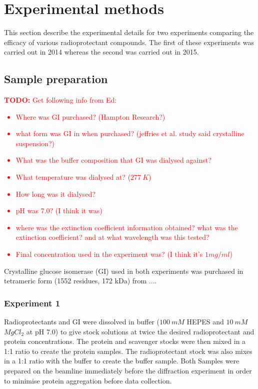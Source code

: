\section{Experimental methods}
\label{sec:Experimental methods}
This section describe the experimental details for two experiments comparing the efficacy of various radioprotectant compounds. The first of these experiments was carried out in 2014 whereas the second was carried out in 2015.

\subsection{Sample preparation}
\label{sub:Sample preparation}
\textcolor{red}{
    \begin{myenumerate}
        \item \hypertarget{todo:Need info from Ed}{\textbf{TODO:} Get following info from Ed:}
        \begin{itemize}
            \item Where was GI purchased? (Hampton Research?)
            \item what form was GI in when purchased? (jeffries et al. study said crystalline suspension?)
            \item What was the buffer composition that GI was dialysed against?
            \item What temperature was dialysed at? ($277\ K$)
            \item How long was it dialysed?
            \item pH was 7.0? (I think it was)
            \item where was the extinction coefficient information obtained? what was the extinction coefficient? and at what wavelength was this tested?
            \item Final concentration used in the experiment was? (I think it's $1 mg/ml$)
        \end{itemize}
    \end{myenumerate}
}
Crystalline glucose isomerase (GI) used in both experiments was purchased in tetrameric form (1552 residues, 172 kDa) from \textcolor{red}{...}.

\subsubsection{Experiment 1}
\label{subs:Experiment 1 - sample prep}
Radioprotectants and GI were dissolved in buffer ($100\ mM$ HEPES and $10\ mM$ $MgCl_2$ at pH 7.0) to give stock solutions at twice the desired radioprotectant and protein concentrations. The protein and scavenger stocks were then mixed in a 1:1 ratio to create the protein samples. The radioprotectant stock was also mixes in a 1:1 ratio with the buffer to create the buffer sample. Both Samples were prepared on the beamline immediately before the diffraction experiment in order to minimise protein aggregation before data collection.

